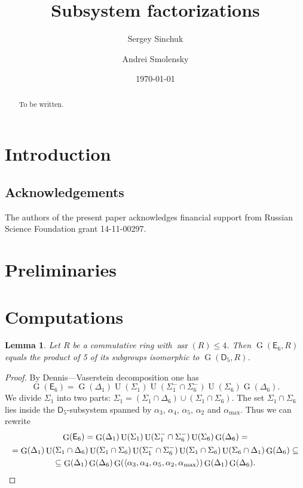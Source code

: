\documentclass[oneside, 12pt]{amsart}
\title [Subsystem factorizations] {Subsystem factorizations}
\author{Sergey Sinchuk}
\author{Andrei Smolensky}
\date {\today}
\theoremstyle{plain}
\numberwithin{equation}{section}
\newtheorem{lemma}{Lemma}
\numberwithin{lemma}{section}
\theoremstyle{definition}
\theoremstyle{remark}
\DeclareMathOperator{\G}{G}
\DeclareMathOperator{\U}{U}
\DeclareMathOperator{\asr}{asr}
\newcommand{\rD}{\mathsf{D}}
\newcommand{\rE}{\mathsf{E}}
\begin{document}
\begin{abstract} To be written. \end{abstract}

\maketitle

\section {Introduction}\label{intro}
 
\subsection{Acknowledgements}
The authors of the present paper acknowledges financial support from Russian Science Foundation grant 14-11-00297.

\section {Preliminaries}\label{prelim}

\section{Computations}
\begin{lemma}\label{lemma:e6-d5}
Let $R$ be a commutative ring with $\asr(R)\leqslant 4$. Then $\G(\rE_6, R)$ equals the product of 5 of its subgroups isomorphic to $\G(\rD_5, R)$.
\end{lemma}
\begin{proof}
By Dennis---Vaserstein decomposition one has
\[ \G(\rE_6) = \G(\Delta_1)\U(\Sigma_1)\U(\Sigma_1^-\cap\Sigma_6^-)\U(\Sigma_6)\G(\Delta_6). \]
We divide $\Sigma_1$ into two parts: $\Sigma_1=(\Sigma_1\cap\Delta_6)\cup(\Sigma_1\cap\Sigma_6)$. The set $\Sigma_1\cap\Sigma_6$ lies inside the $\rD_5$-subsystem spanned by $\alpha_3$, $\alpha_4$, $\alpha_5$, $\alpha_2$ and $\alpha_{\max}$. Thus we can rewrite
\begin{multline*}
\G(\rE_6) = \G(\Delta_1) \U(\Sigma_1) \U(\Sigma_1^-\cap\Sigma_6^-) \U(\Sigma_6) \G(\Delta_6) = \\
= \G(\Delta_1) \U(\Sigma_1\cap\Delta_6) \U(\Sigma_1\cap\Sigma_6) \U(\Sigma_1^-\cap\Sigma_6^-) \U(\Sigma_1\cap\Sigma_6) \U(\Sigma_6\cap\Delta_1) \G(\Delta_6) \subseteq \\
\subseteq \G(\Delta_1) \G(\Delta_6) \G(\langle\alpha_3, \alpha_4, \alpha_5, \alpha_2, \alpha_{\max}\rangle) \G(\Delta_1) \G(\Delta_6).\qedhere
\end{multline*}
\end{proof}
\end{document}
